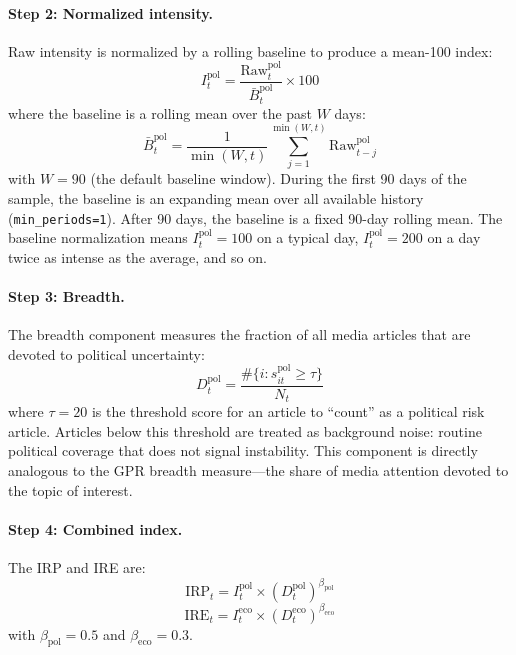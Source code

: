 \documentclass[12pt,a4paper]{article}
\begin{document}
\paragraph{Step 2: Normalized intensity.}
Raw intensity is normalized by a rolling baseline to produce a
mean-100 index:
\begin{equation}
  I_t^{\text{pol}} = \frac{\text{Raw}_t^{\text{pol}}}{\bar{B}_t^{\text{pol}}} \times 100
  \label{eq:intensity}
\end{equation}
where the baseline is a rolling mean over the past $W$ days:
\begin{equation}
  \bar{B}_t^{\text{pol}} = \frac{1}{\min(W, t)} \sum_{j=1}^{\min(W, t)} \text{Raw}_{t-j}^{\text{pol}}
  \label{eq:baseline}
\end{equation}
with $W = 90$ (the default baseline window).  During the first 90 days of
the sample, the baseline is an expanding mean over all available history
(\texttt{min\_periods=1}).  After 90 days, the baseline is a fixed 90-day
rolling mean.  The baseline normalization means $I_t^{\text{pol}} = 100$
on a typical day, $I_t^{\text{pol}} = 200$ on a day twice as intense as
the average, and so on.

\paragraph{Step 3: Breadth.}
The breadth component measures the fraction of all media articles that
are devoted to political uncertainty:
\begin{equation}
  D_t^{\text{pol}} = \frac{\#\{i : s_{it}^{\text{pol}} \geq \tau\}}{N_t}
  \label{eq:breadth}
\end{equation}
where $\tau = 20$ is the threshold score for an article to ``count'' as a
political risk article.  Articles below this threshold are treated as
background noise: routine political coverage that does not signal
instability.  This component is directly analogous to the GPR breadth
measure---the share of media attention devoted to the topic of interest.

\paragraph{Step 4: Combined index.}
The IRP and IRE are:
\begin{equation}
  \text{IRP}_t = I_t^{\text{pol}} \times \left(D_t^{\text{pol}}\right)^{\beta_{\text{pol}}}
  \label{eq:irp}
\end{equation}
\begin{equation}
  \text{IRE}_t = I_t^{\text{eco}} \times \left(D_t^{\text{eco}}\right)^{\beta_{\text{eco}}}
  \label{eq:ire}
\end{equation}
with $\beta_{\text{pol}} = 0.5$ and $\beta_{\text{eco}} = 0.3$.
\end{document}
